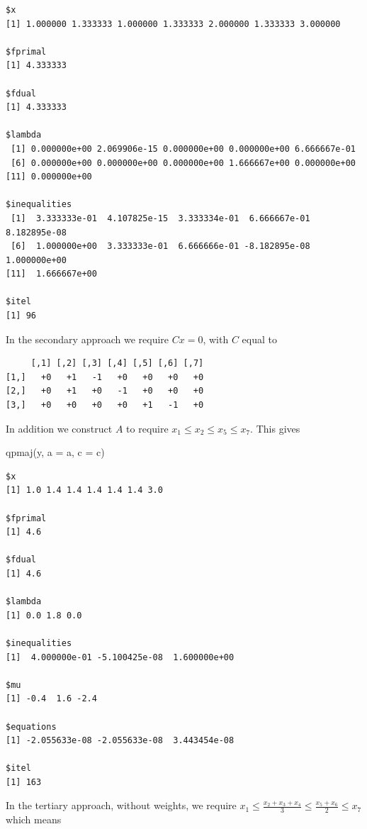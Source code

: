 \documentclass[
  12pt,
  letterpaper,
  DIV=11,
  numbers=noendperiod]{scrreprt}
\newenvironment{Shaded}{\begin{snugshade}}{\end{snugshade}}
\newcommand{\AttributeTok}[1]{\textcolor[rgb]{0.40,0.45,0.13}{#1}}
\newcommand{\FunctionTok}[1]{\textcolor[rgb]{0.28,0.35,0.67}{#1}}
\newcommand{\NormalTok}[1]{\textcolor[rgb]{0.00,0.23,0.31}{#1}}
\theoremstyle{remark}
\begin{document}
\begin{verbatim}
$x
[1] 1.000000 1.333333 1.000000 1.333333 2.000000 1.333333 3.000000

$fprimal
[1] 4.333333

$fdual
[1] 4.333333

$lambda
 [1] 0.000000e+00 2.069906e-15 0.000000e+00 0.000000e+00 6.666667e-01
 [6] 0.000000e+00 0.000000e+00 0.000000e+00 1.666667e+00 0.000000e+00
[11] 0.000000e+00

$inequalities
 [1]  3.333333e-01  4.107825e-15  3.333334e-01  6.666667e-01  8.182895e-08
 [6]  1.000000e+00  3.333333e-01  6.666666e-01 -8.182895e-08  1.000000e+00
[11]  1.666667e+00

$itel
[1] 96
\end{verbatim}

In the secondary approach we require \(Cx=0\), with \(C\) equal to

\begin{verbatim}
     [,1] [,2] [,3] [,4] [,5] [,6] [,7]
[1,]   +0   +1   -1   +0   +0   +0   +0
[2,]   +0   +1   +0   -1   +0   +0   +0
[3,]   +0   +0   +0   +0   +1   -1   +0
\end{verbatim}

In addition we construct \(A\) to require
\(x_1\leq x_2\leq x_5\leq x_7\). This gives

\begin{Shaded}
\begin{Highlighting}[]
\FunctionTok{qpmaj}\NormalTok{(y, }\AttributeTok{a =}\NormalTok{ a, }\AttributeTok{c =}\NormalTok{ c)}
\end{Highlighting}
\end{Shaded}

\begin{verbatim}
$x
[1] 1.0 1.4 1.4 1.4 1.4 1.4 3.0

$fprimal
[1] 4.6

$fdual
[1] 4.6

$lambda
[1] 0.0 1.8 0.0

$inequalities
[1]  4.000000e-01 -5.100425e-08  1.600000e+00

$mu
[1] -0.4  1.6 -2.4

$equations
[1] -2.055633e-08 -2.055633e-08  3.443454e-08

$itel
[1] 163
\end{verbatim}

In the tertiary approach, without weights, we require
\(x_1\leq\frac{x_2+x_3+x_4}{3}\leq\frac{x_5+x_6}{2}\leq x_7\) which
means
\end{document}
